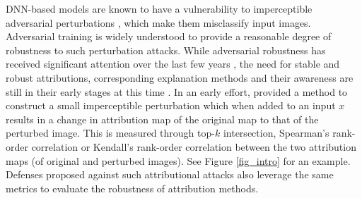 \documentclass[letterpaper]{article} %
\begin{document}
DNN-based models are known to have a vulnerability to imperceptible adversarial perturbations \citep{Biggio_2013,szegedy2014intriguing,goodfellow15fgsm}, which make them misclassify input images. %
Adversarial training \citep{madry2019deep} is widely understood to provide a reasonable degree of robustness to such perturbation attacks. 
While adversarial robustness has received significant attention over the last few years \citep{ozdag2018advsurvey,silva2020advrobustsurvey}, the need for stable and robust attributions, corresponding explanation methods and their awareness are still in their early stages at this time \citep{ghorbani2018interpretation,chen2019robust,slack2020fooling,sarkar2020enhanced,lakkaraju2020icml,slack2021neurips-a,slack2021neurips-b}. In an early effort, \citep{ghorbani2018interpretation} provided a method to construct a small imperceptible perturbation which when added to an input $x$ results in a change in attribution map of the original map to that of the perturbed image. This is measured through top-$k$ intersection, Spearman's rank-order correlation or Kendall's rank-order correlation between the two attribution maps (of original and perturbed images). See Figure \ref{fig_intro} for an example. Defenses proposed against such attributional attacks %
\citep{chen2019robust,singh2020attributional,wang2020smoothed,sarkar2020enhanced}
also leverage the same metrics to evaluate the robustness of attribution methods.
\end{document}
